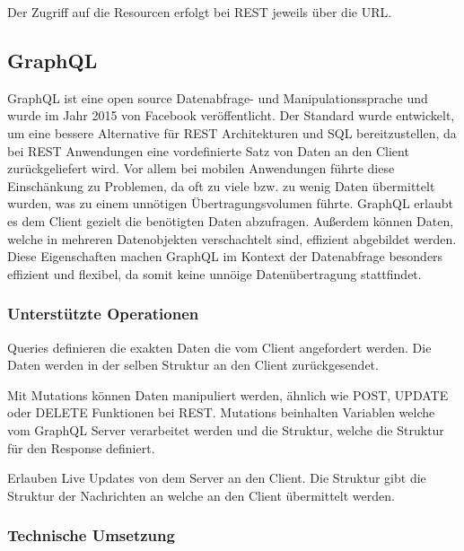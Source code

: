 Der Zugriff auf die Resourcen erfolgt bei REST jeweils über die URL.

\clearpage
\subsection{GraphQL}
GraphQL ist eine open source Datenabfrage- und Manipulationssprache und wurde im Jahr 2015 von Facebook veröffentlicht.
Der Standard wurde entwickelt, um eine bessere Alternative für REST Architekturen und SQL bereitzustellen, da bei REST Anwendungen eine vordefinierte Satz von Daten an den Client  zurückgeliefert wird. Vor allem bei mobilen Anwendungen führte diese Einschänkung zu Problemen, da oft zu viele bzw. zu wenig Daten übermittelt wurden, was zu einem unnötigen Übertragungsvolumen führte.
GraphQL erlaubt es dem Client gezielt die benötigten Daten abzufragen. Außerdem können Daten, welche in mehreren Datenobjekten verschachtelt sind, effizient abgebildet werden. Diese Eigenschaften machen GraphQL im Kontext der Datenabfrage besonders effizient und flexibel, da somit keine unnöige Datenübertragung stattfindet. 


\subsubsection*{Unterstützte Operationen}

\begin{description}[leftmargin=2cm, style=nextline]
	\item[Queries (schreibend):]  
	Queries definieren die exakten Daten die vom Client angefordert werden. Die Daten werden in der selben Struktur an den Client zurückgesendet.
	
	\item[Mutations (manipulierend): ]  
	Mit Mutations können Daten manipuliert werden, ähnlich wie POST, UPDATE oder DELETE Funktionen bei REST. Mutations beinhalten Variablen welche vom GraphQL Server verarbeitet werden und die Struktur, welche die Struktur für den Response definiert.
	
	\item[Subscriptions:]  
	Erlauben Live Updates von dem Server an den Client. Die Struktur gibt die Struktur der Nachrichten an welche an den Client übermittelt werden. 
\end{description}

\subsubsection*{Technische Umsetzung}

